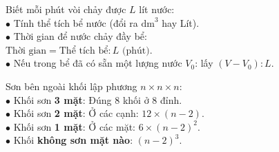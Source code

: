 \documentclass[14pt,a4paper,oneside]{extbook}
\begin{document}
\noindent
\begin{minipage}[t]{0.52\textwidth}
  \begin{tcolorbox}[
    enhanced,
    title={\footnotesize\bfseries\color{white}\faTint\ 2. Bài toán vòi nước chảy vào bể},
    colback=teal!2!white,
    colframe=teal!75!black,
    arc=2.5mm, boxrule=0.8pt, top=1.8mm, bottom=1.8mm, left=2.2mm, right=2.2mm
  ]
    \footnotesize
    Biết mỗi phút vòi chảy được $L$ lít nước:\\
    $\bullet$ Tính thể tích bể nước (đổi ra $\text{dm}^3$ hay Lít).\\
    $\bullet$ Thời gian để nước chảy đầy bể:\\
    \quad $\text{Thời gian} = \text{Thể tích bể} : L\text{ (phút)}$.\\
    $\bullet$ Nếu trong bể đã có sẵn một lượng nước $V_0$: lấy $(V - V_0) : L$.
  \end{tcolorbox}
\end{minipage}%
\hfill
\begin{minipage}[t]{0.46\textwidth}
  \begin{tcolorbox}[
    enhanced,
    title={\footnotesize\bfseries\color{white}\faCubes\ 3. Bài toán sơn các mặt khối nhỏ},
    colback=purple!2!white,
    colframe=purple!70!black,
    arc=2.5mm, boxrule=0.8pt, top=1.8mm, bottom=1.8mm, left=2mm, right=2mm
  ]
    \footnotesize
    Sơn bên ngoài khối lập phương $n \times n \times n$:\\
    $\bullet$ Khối sơn \textbf{3 mặt}: Đúng $8$ khối ở $8$ đỉnh.\\
    $\bullet$ Khối sơn \textbf{2 mặt}: Ở các cạnh: $12 \times (n - 2)$.\\
    $\bullet$ Khối sơn \textbf{1 mặt}: Ở các mặt: $6 \times (n - 2)^2$.\\
    $\bullet$ Khối \textbf{không sơn mặt nào}: $(n - 2)^3$.
  \end{tcolorbox}
\end{minipage}

\vspace{3mm}
\end{document}
